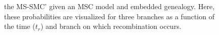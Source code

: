 \documentclass[11pt]{article}
\begin{document}
\begin{figure}
{		the MS-SMC' given an MSC model and embedded genealogy. Here, these
		probabilities are visualized for three branches as a function of the time 
		($t_r$) and branch on which recombination occurs.
	}
	\label{fig:fig1}
\end{figure}
\end{document}
